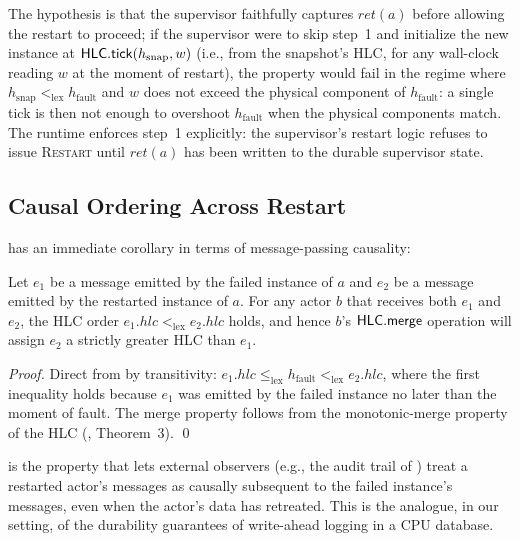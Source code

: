 The hypothesis is that the supervisor faithfully captures
\(\mathit{ret}(a)\) before allowing the restart to proceed; if the
supervisor were to skip step~1 and initialize the new instance at
\(\mathsf{HLC}.\mathsf{tick}(h_{\mathrm{snap}}, w)\) (i.e., from the
snapshot's HLC, for any wall-clock reading \(w\) at the moment of
restart), the property would fail in the regime where
\(h_{\mathrm{snap}} <_{\mathrm{lex}} h_{\mathrm{fault}}\) and
\(w\) does not exceed the physical component of
\(h_{\mathrm{fault}}\): a single tick is then not enough to
overshoot \(h_{\mathrm{fault}}\) when the physical components
match.  The runtime enforces step~1
explicitly: the supervisor's restart logic refuses to issue
\textsc{Restart} until \(\mathit{ret}(a)\) has been written to the
durable supervisor state.

\subsection{Causal Ordering Across Restart}
\label{sec:supervision:causal}

 has an immediate corollary in terms
of message-passing causality:

\begin{corollary}
\label{cor:restart-causal}
Let \(e_1\) be a message emitted by the failed instance of \(a\) and
\(e_2\) be a message emitted by the restarted instance of \(a\).
For any actor \(b\) that receives both \(e_1\) and \(e_2\), the HLC
order \(e_1.\mathit{hlc} <_{\mathrm{lex}} e_2.\mathit{hlc}\) holds,
and hence \(b\)'s
\(\mathsf{HLC}.\mathsf{merge}\) operation will assign \(e_2\) a strictly
greater HLC than \(e_1\).
\end{corollary}

\begin{proof}
Direct from  by transitivity:
\(e_1.\mathit{hlc} \le_{\mathrm{lex}} h_{\mathrm{fault}}
<_{\mathrm{lex}} e_2.\mathit{hlc}\), where the first inequality
holds because \(e_1\) was emitted by the failed instance no later
than the moment of fault.  The merge property follows from the
monotonic-merge property of the HLC
(\citet{kulkarni2014hlc}, Theorem~3).
\qed
\end{proof}

 is the property that lets external
observers (e.g., the audit trail of ) treat
a restarted actor's messages as causally subsequent to the failed
instance's messages, even when the actor's data has retreated.  This
is the analogue, in our setting, of the durability guarantees of
write-ahead logging in a CPU database.

